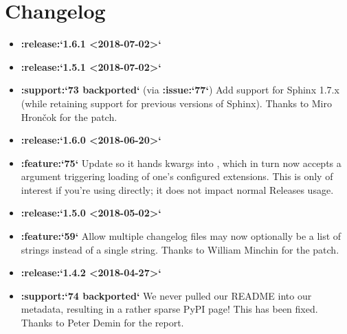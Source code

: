 \documentclass[letterpaper,10pt,english]{sphinxmanual}
\begin{document}
\chapter{Changelog}
\label{\detokenize{changelog:changelog}}\label{\detokenize{changelog::doc}}\begin{itemize}
\item {} 
{\color{red}\bfseries{}:release:{}`1.6.1 \textless{}2018-07-02\textgreater{}{}`}

\item {} 
{\color{red}\bfseries{}:release:{}`1.5.1 \textless{}2018-07-02\textgreater{}{}`}

\item {} 
{\color{red}\bfseries{}:support:{}`73 backported{}`} (via {\color{red}\bfseries{}:issue:{}`77{}`}) Add support for Sphinx 1.7.x
(while retaining support for previous versions of Sphinx). Thanks to Miro
Hrončok for the patch.

\item {} 
{\color{red}\bfseries{}:release:{}`1.6.0 \textless{}2018-06-20\textgreater{}{}`}

\item {} 
{\color{red}\bfseries{}:feature:{}`75{}`} Update  so it hands kwargs
into , which in turn now accepts a
 argument triggering loading of one’s configured
extensions. This is only of interest if you’re using 
directly; it does not impact normal Releases usage.

\item {} 
{\color{red}\bfseries{}:release:{}`1.5.0 \textless{}2018-05-02\textgreater{}{}`}

\item {} 
{\color{red}\bfseries{}:feature:{}`59{}`} Allow multiple changelog files \textendash{} 
may now optionally be a list of strings instead of a single string. Thanks to
William Minchin for the patch.

\item {} 
{\color{red}\bfseries{}:release:{}`1.4.2 \textless{}2018-04-27\textgreater{}{}`}

\item {} 
{\color{red}\bfseries{}:support:{}`74 backported{}`} We never pulled our README into our 
metadata, resulting in a rather sparse PyPI page! This has been fixed. Thanks
to Peter Demin for the report.


\end{itemize}
\end{document}

